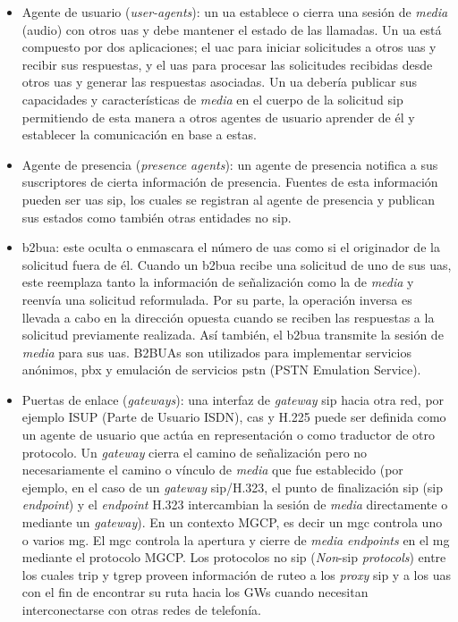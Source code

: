 \documentclass[a4paper,12pt]{report}
\begin{document}
\begin{itemize}
\item Agente de usuario (\emph{user-agents}):
un \ac{ua} establece o cierra una sesión de \emph{media} (audio) con otros
\ac{ua}s y debe mantener el estado de las llamadas. Un \ac{ua} está compuesto por dos
aplicaciones; el \ac{uac} para iniciar solicitudes
a otros \ac{ua}s y recibir sus respuestas, y el \ac{uas} para procesar las solicitudes recibidas desde otros \ac{ua}s y
generar las respuestas asociadas. Un \ac{ua} debería publicar sus capacidades y
características de \emph{media} en el cuerpo de la solicitud \ac{sip} permitiendo de esta
manera a otros agentes de usuario aprender de él y establecer la comunicación
en base a estas.

\item Agente de presencia (\emph{presence agents}):
un agente de presencia notifica a sus suscriptores de cierta información de
presencia. Fuentes de esta información pueden ser \ac{ua}s \ac{sip}, los cuales se
registran al agente de presencia y publican sus estados como también otras
entidades no \ac{sip}.

\item \ac{b2bua}:
este oculta o enmascara el número de \ac{ua}s como si el
originador de la solicitud fuera de él. Cuando un \ac{b2bua}
recibe una solicitud de uno de sus \ac{ua}s, este reemplaza tanto la
información de señalización como la de \emph{media} y reenvía una solicitud
reformulada. Por su parte, la operación inversa es llevada a cabo en la
dirección opuesta cuando se reciben las respuestas a la solicitud previamente
realizada. Así también, el \ac{b2bua} transmite la sesión de \emph{media} para sus \ac{ua}s.
B2BUAs son utilizados para implementar servicios anónimos, \ac{pbx} y emulación de servicios \ac{pstn}
(PSTN Emulation Service). 

\item Puertas de enlace (\emph{gateways}):
una interfaz de \emph{gateway} \ac{sip} hacia otra red, por ejemplo ISUP (Parte de Usuario
ISDN), \ac{cas} y
H.225 puede ser definida como un agente de usuario que actúa en representación
o como traductor de otro protocolo. Un \emph{gateway} cierra el camino de señalización
pero no necesariamente el camino o vínculo de \emph{media} que fue establecido (por
ejemplo, en el caso de un \emph{gateway} \ac{sip}/H.323, el punto de finalización \ac{sip} (\ac{sip}
\emph{endpoint}) y el \emph{endpoint} H.323 intercambian la sesión de \emph{media} directamente o
mediante un \emph{gateway}). En un contexto MGCP, es decir un \ac{mgc}
controla uno o varios \ac{mg}. El \ac{mgc} controla la
apertura y cierre de \emph{media endpoints} en el \ac{mg} mediante el protocolo MGCP. Los
protocolos no \ac{sip} (\emph{Non}-\ac{sip} \emph{protocols}) entre los cuales \ac{trip}
y \ac{tgrep} proveen información de ruteo
a los \emph{proxy} \ac{sip} y a los \ac{ua}s con el fin de encontrar su ruta hacia los GWs
cuando necesitan interconectarse con otras redes de telefonía.


\end{itemize}
\end{document}

